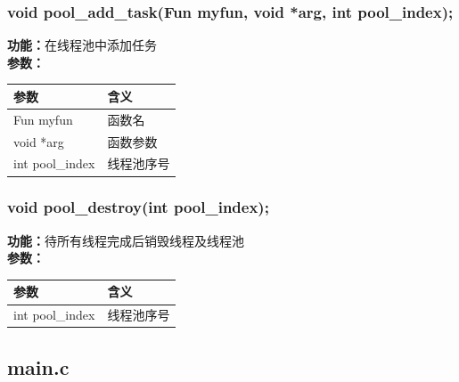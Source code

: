\documentclass{article}
\begin{document}
\subsubsection{void pool\_add\_task(Fun myfun, void *arg, int pool\_index);}
\textbf{功能：}在线程池中添加任务\\
\textbf{参数：}\\
\begin{tabular}[H]{|l|l|}%
	\hline  %
	参数            & 含义       \\
	\hline
	Fun myfun       & 函数名     \\
	\hline
	void *arg       & 函数参数   \\
	\hline
	int pool\_index & 线程池序号 \\
	\hline
\end{tabular}

\subsubsection{void pool\_destroy(int pool\_index);}
\textbf{功能：}待所有线程完成后销毁线程及线程池\\
\textbf{参数：}\\
\begin{tabular}[H]{|l|l|}%
	\hline  %
	参数            & 含义       \\
	\hline
	int pool\_index & 线程池序号 \\
	\hline
\end{tabular}

\subsection{main.c}
\end{document}
